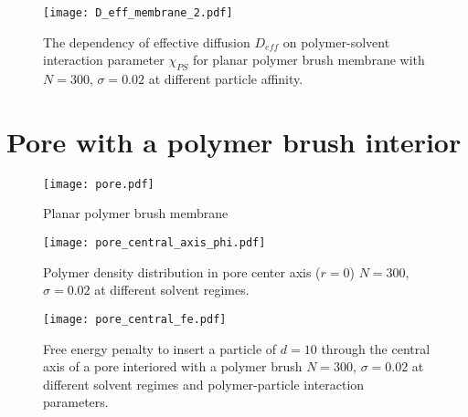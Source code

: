 \documentclass[12pt,a4paper]{article}
\begin{document}
\begin{figure}
    \center
    \texttt{[image: D\_eff\_membrane\_2.pdf]}
    \caption{The dependency of effective diffusion $D_{eff}$ on polymer-solvent interaction parameter $\chi_{PS}$ for planar polymer brush membrane with $N=300$, $\sigma = 0.02$ at different particle affinity.}
    \label{fig:D_eff_planar_2}
\end{figure}

\section{Pore with a polymer brush interior}



\begin{figure}
    \center
    \texttt{[image: pore.pdf]}
    \caption{Planar polymer brush membrane}
    \label{fig:membrane}
\end{figure}

\begin{figure}
    \center
    \texttt{[image: pore\_central\_axis\_phi.pdf]}
    \caption{Polymer density distribution in pore center axis ($r=0$) $N=300$, $\sigma = 0.02$ at different solvent regimes.}
    \label{fig:phi_pore}
\end{figure}


\begin{figure}
    \center
    \texttt{[image: pore\_central\_fe.pdf]}
    \caption{Free energy penalty to insert a particle of $d=10$ through the central axis of a pore interiored with a polymer brush $N=300$, $\sigma = 0.02$ at different solvent regimes and polymer-particle interaction parameters.}
    \label{fig:fe_planar}
\end{figure}
\end{document}
